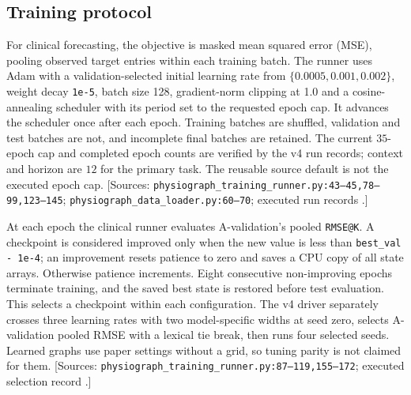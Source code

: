 \subsection{Training protocol}\label{app:trainingprotocol}


For clinical forecasting, the objective is masked mean squared error (MSE), pooling observed target entries within each training batch. The runner uses Adam with a validation-selected initial learning rate from $\{0.0005,0.001,0.002\}$, weight decay \texttt{1e-5}, batch size 128, gradient-norm clipping at 1.0 and a cosine-annealing scheduler with its period set to the requested epoch cap. It advances the scheduler once after each epoch. Training batches are shuffled, validation and test batches are not, and incomplete final batches are retained. The current $35$-epoch cap and completed epoch counts are verified by the v4 run records; context and horizon are $12$ for the primary task. The reusable source default is not the executed epoch cap. [Sources: \texttt{physiograph\_\allowbreak{}training\_\allowbreak{}runner.\allowbreak{}py:\allowbreak{}43–\allowbreak{}45,\allowbreak{}78–\allowbreak{}99,\allowbreak{}123–\allowbreak{}145}; \texttt{physiograph\_\allowbreak{}data\_\allowbreak{}loader.\allowbreak{}py:\allowbreak{}60–\allowbreak{}70}; executed run records .]

At each epoch the clinical runner evaluates A-validation's pooled \texttt{RMSE@K}. A checkpoint is considered improved only when the new value is less than \texttt{best\_\allowbreak{}val - 1e-4}; an improvement resets patience to zero and saves a CPU copy of all state arrays. Otherwise patience increments. Eight consecutive non-improving epochs terminate training, and the saved best state is restored before test evaluation. This selects a checkpoint within each configuration. The v4 driver separately crosses three learning rates with two model-specific widths at seed zero, selects A-validation pooled RMSE with a lexical tie break, then runs four selected seeds. Learned graphs use paper settings without a grid, so tuning parity is not claimed for them. [Sources: \texttt{physiograph\_\allowbreak{}training\_\allowbreak{}runner.\allowbreak{}py:\allowbreak{}87–\allowbreak{}119,\allowbreak{}155–\allowbreak{}172}; executed selection record .]

